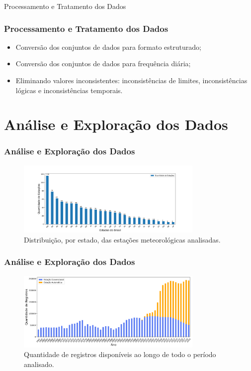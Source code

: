 \documentclass[aspectratio=169]{beamer}
\begin{document}
\begin{frame}{Processamento e Tratamento dos Dados}
\frametitle{Processamento e Tratamento dos Dados}

\begin{itemize}
	\item Conversão dos conjuntos de dados para formato estruturado; 
	\item Conversão dos conjuntos de dados para frequência diária; 
	\item Eliminando valores inconsistentes: inconsistências de limites, inconsistências lógicas e inconsistências temporais.
\end{itemize}

\end{frame}


\section{Análise e Exploração dos Dados}

\begin{frame}
    \frametitle{Análise e Exploração dos Dados}

	\begin{figure}[H]
	\centering
	\caption{Distribuição, por estado, das estações meteorológicas analisadas.}
	\includegraphics[width=0.8\textwidth]{figuras/estacoes_por_estado.png}
	\end{figure}
\end{frame}

\begin{frame}
    \frametitle{Análise e Exploração dos Dados}

	\begin{figure}[H]
	\centering
	\caption{Quantidade de registros disponíveis ao longo de todo o período analisado.}
	\includegraphics[width=0.8\textwidth]{figuras/disponibilizade_historica_de_dados.png}
	\end{figure}
\end{frame}
\end{document}
